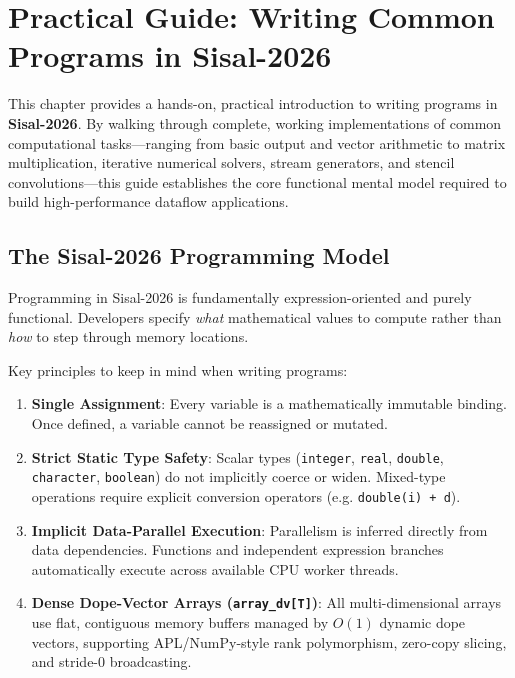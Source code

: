 \chapter{Practical Guide: Writing Common Programs in Sisal-2026}
\label{chap:writing_sisal_programs}

This chapter provides a hands-on, practical introduction to writing programs in \textbf{Sisal-2026}. By walking through complete, working implementations of common computational tasks—ranging from basic output and vector arithmetic to matrix multiplication, iterative numerical solvers, stream generators, and stencil convolutions—this guide establishes the core functional mental model required to build high-performance dataflow applications.

\section{The Sisal-2026 Programming Model}
Programming in Sisal-2026 is fundamentally expression-oriented and purely functional. Developers specify \emph{what} mathematical values to compute rather than \emph{how} to step through memory locations.

Key principles to keep in mind when writing programs:
\begin{enumerate}
    \item \textbf{Single Assignment}: Every variable is a mathematically immutable binding. Once defined, a variable cannot be reassigned or mutated.
    \item \textbf{Strict Static Type Safety}: Scalar types (\texttt{integer}, \texttt{real}, \texttt{double}, \texttt{character}, \texttt{boolean}) do not implicitly coerce or widen. Mixed-type operations require explicit conversion operators (e.g. \texttt{double(i) + d}).
    \item \textbf{Implicit Data-Parallel Execution}: Parallelism is inferred directly from data dependencies. Functions and independent expression branches automatically execute across available CPU worker threads.
    \item \textbf{Dense Dope-Vector Arrays (\texttt{array\_dv[T]})}: All multi-dimensional arrays use flat, contiguous memory buffers managed by $O(1)$ dynamic dope vectors, supporting APL/NumPy-style rank polymorphism, zero-copy slicing, and stride-0 broadcasting.
\end{enumerate}

